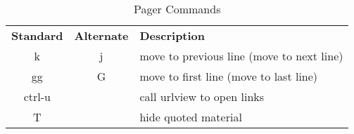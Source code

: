 \documentclass{article}
\begin{document}
\begin{table*}[!b]
\renewcommand{\arraystretch}{1.3}
\caption{Pager Commands}
\label{tab:pager}
\footnotesize
\begin{tabulary}{\textwidth}{CCL}
  \textbf{Standard} & \textbf{Alternate} & \textbf{Description}\\
  k & j & move to previous line (move to next line)\\
  gg & G & move to first line (move to last line)\\
  ctrl-u & & call urlview to open links\\
  T & & hide quoted material\\
\end{tabulary}
\end{table*}
\end{document}
